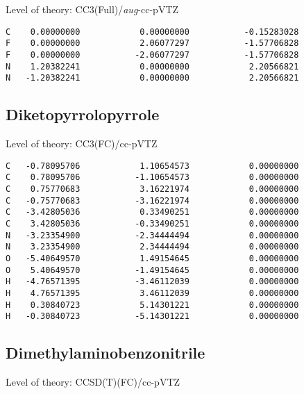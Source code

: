 \documentclass[journal=jctcce,manuscript=article,layout=traditional]{achemso}
\newcommand{\TZ}{cc-pVTZ}
\newcommand{\AVTZ}{\emph{aug}-cc-pVTZ}
\begin{document}
\begin{singlespace}
Level of theory: CC3(Full)/{\AVTZ}
\begin{verbatim}
C    0.00000000            0.00000000           -0.15283028
F    0.00000000            2.06077297           -1.57706828
F    0.00000000           -2.06077297           -1.57706828
N    1.20382241            0.00000000            2.20566821
N   -1.20382241            0.00000000            2.20566821
\end{verbatim}
\end{singlespace}

\subsection*{Diketopyrrolopyrrole}

\begin{singlespace}
Level of theory: CC3(FC)/{\TZ}
\begin{verbatim}
C   -0.78095706            1.10654573            0.00000000
C    0.78095706           -1.10654573            0.00000000
C    0.75770683            3.16221974            0.00000000
C   -0.75770683           -3.16221974            0.00000000
C   -3.42805036            0.33490251            0.00000000
C    3.42805036           -0.33490251            0.00000000
N   -3.23354900           -2.34444494            0.00000000
N    3.23354900            2.34444494            0.00000000
O   -5.40649570            1.49154645            0.00000000
O    5.40649570           -1.49154645            0.00000000
H   -4.76571395           -3.46112039            0.00000000
H    4.76571395            3.46112039            0.00000000
H    0.30840723            5.14301221            0.00000000
H   -0.30840723           -5.14301221            0.00000000
\end{verbatim}
\end{singlespace}

\subsection*{Dimethylaminobenzonitrile}

\begin{singlespace}
Level of theory: CCSD(T)(FC)/{\TZ}
\end{singlespace}
\end{document}
